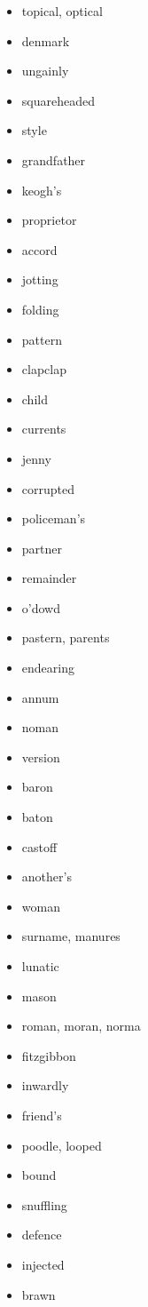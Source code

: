 \documentclass{article}
\begin{document}
\begin{itemize}
    \item topical, optical
    \item denmark
    \item ungainly
    \item squareheaded
    \item style
    \item grandfather
    \item keogh's
    \item proprietor
    \item accord
    \item jotting
    \item folding
    \item pattern
    \item clapclap
    \item child
    \item currents
    \item jenny
    \item corrupted
    \item policeman's
    \item partner
    \item remainder
    \item o'dowd
    \item pastern, parents
    \item endearing
    \item annum
    \item noman
    \item version
    \item baron
    \item baton
    \item castoff
    \item another's
    \item woman
    \item surname, manures
    \item lunatic
    \item mason
    \item roman, moran, norma
    \item fitzgibbon
    \item inwardly
    \item friend's
    \item poodle, looped
    \item bound
    \item snuffling
    \item defence
    \item injected
    \item brawn

\end{itemize}
\end{document}
